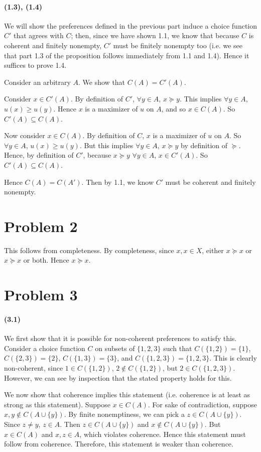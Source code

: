 \documentclass[10pt,letter]{article}
\begin{document}
\paragraph{(1.3), (1.4)} We will show the preferences defined in the previous part induce a choice function $C'$ that agrees with $C$; then, since we have shown 1.1, we know that because $C$ is coherent and finitely nonempty, $C'$ must be finitely nonempty too (i.e. we see that part 1.3 of the proposition follows immediately from 1.1 and 1.4). Hence it suffices to prove 1.4.

Consider an arbitrary $A$. We show that $C(A) = C'(A)$.

Consider $x \in C'(A)$. By definition of $C'$, $\forall y \in A$, $x \succeq y$. This implies $\forall y \in A$, $u(x) \ge u(y)$. Hence $x$ is a maximizer of $u$ on $A$, and so $x \in C(A)$. So $C'(A) \subseteq C(A)$.

Now consider $x \in C(A)$. By definition of $C$, $x$ is a maximizer of $u$ on $A$. So $\forall y \in A$, $u(x) \ge u(y)$. But this implies $\forall y \in A$, $x \succeq y$ by definition of $\succeq$. Hence, by definition of $C'$, because $x \succeq y$ $\forall y \in A$, $x \in C'(A)$. So $C'(A) \subseteq C(A)$.

Hence $C(A) = C(A')$. Then by 1.1, we know $C'$ must be coherent and finitely nonempty.

\section*{Problem 2}
This follows from completeness. By completeness, since $x, x \in X$, either $x \succeq x$ or $x \succeq x$ or both. Hence $x \succeq x$.
\section*{Problem 3}
\paragraph{(3.1)}
We first show that it is possible for non-coherent preferences to satisfy this. Consider a choice function $C$ on subsets of $\{ 1, 2, 3 \}$ such that $C(\{ 1, 2 \}) = \{ 1 \}$, $C(\{ 2, 3 \}) = \{ 2 \}$, $C(\{ 1, 3 \}) = \{ 3 \}$, and $C(\{ 1, 2, 3\}) = \{ 1, 2, 3  \}$. This is clearly non-coherent, since $1 \in C(\{ 1, 2\})$, $2 \not\in C(\{ 1, 2 \})$, but $2 \in C(\{ 1, 2, 3 \})$. However, we can see by inspection that the stated property holds for this.

We now show that coherence implies this statement (i.e. coherence is at least as strong as this statement). Suppose $x \in C(A)$. For sake of contradiction, suppose $x,y \not\in C(A\cup \{ y\})$. By finite nonemptiness, we can pick a $z \in C(A\cup \{ y\})$. Since $z \neq y$, $z \in A$. Then $z \in C(A\cup \{ y\})$ and $x \not\in C(A\cup \{ y\})$. But
$x \in C(A)$ and $x,z \in A$, which violates coherence. Hence this statement must follow from coherence. Therefore, this statement is weaker than coherence.
\end{document}

